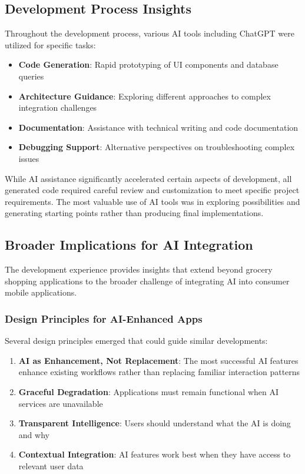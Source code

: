 \documentclass[11pt,a4paper]{article}
\begin{document}
\subsection{Development Process Insights}

Throughout the development process, various AI tools including ChatGPT were utilized for specific tasks:

\begin{itemize}
    \item \textbf{Code Generation}: Rapid prototyping of UI components and database queries
    \item \textbf{Architecture Guidance}: Exploring different approaches to complex integration challenges
    \item \textbf{Documentation}: Assistance with technical writing and code documentation
    \item \textbf{Debugging Support}: Alternative perspectives on troubleshooting complex issues
\end{itemize}

While AI assistance significantly accelerated certain aspects of development, all generated code required careful review and customization to meet specific project requirements. The most valuable use of AI tools was in exploring possibilities and generating starting points rather than producing final implementations.

\subsection{Broader Implications for AI Integration}

The development experience provides insights that extend beyond grocery shopping applications to the broader challenge of integrating AI into consumer mobile applications.

\subsubsection{Design Principles for AI-Enhanced Apps}

Several design principles emerged that could guide similar developments:

\begin{enumerate}
    \item \textbf{AI as Enhancement, Not Replacement}: The most successful AI features enhance existing workflows rather than replacing familiar interaction patterns
    \item \textbf{Graceful Degradation}: Applications must remain functional when AI services are unavailable
    \item \textbf{Transparent Intelligence}: Users should understand what the AI is doing and why
    \item \textbf{Contextual Integration}: AI features work best when they have access to relevant user data
\end{enumerate}
\end{document}
